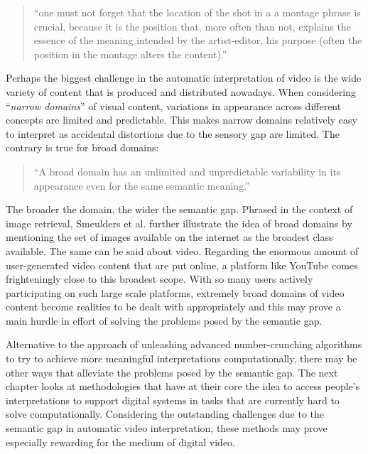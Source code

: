 \begin{quote}
  ``one must not forget that the location of the shot in a a montage phrase is crucial, because it is the position that, more often than not, explains the essence of the meaning intended by the artist-editor, his purpose (often the position in the montage alters the content).''\cite[``The Principles of Montage'']{kuleshov1974kuleshov}
\end{quote}

Perhaps the biggest challenge in the automatic interpretation of video is the wide variety of content that is produced and distributed nowadays. When considering ``\emph{narrow domains}'' of visual content, variations in appearance across different concepts are limited and predictable\cite{Smeulders:2000tx}. This makes narrow domains relatively easy to interpret as accidental distortions due to the sensory gap are limited. The contrary is true for broad domains:

\begin{quote}
  ``A broad domain has an unlimited and unpredictable variability in its appearance even for the same semantic meaning.''\cite{Smeulders:2000tx}
\end{quote}

The broader the domain, the wider the semantic gap. Phrased in the context of image retrieval, Smeulders et al. further illustrate the idea of broad domains by mentioning the set of images available on the internet as the broadest class available. The same can be said about video. Regarding the enormous amount of user-generated video content that are put online, a platform like YouTube comes frighteningly close to this broadest scope. With so many users actively participating on such large scale platforms, extremely broad domains of video content become realities to be dealt with appropriately and this may prove a main hurdle in effort of solving the problems posed by the semantic gap.

Alternative to the approach of unleashing advanced number-crunching algorithms to try to achieve more meaningful interpretations computationally, there may be other ways that alleviate the problems posed by the semantic gap. The next chapter looks at methodologies that have at their core the idea to access people's interpretations to support digital systems in tasks that are currently hard to solve computationally. Considering the outstanding challenges due to the semantic gap in automatic video interpretation, these methods may prove especially rewarding for the medium of digital video.

